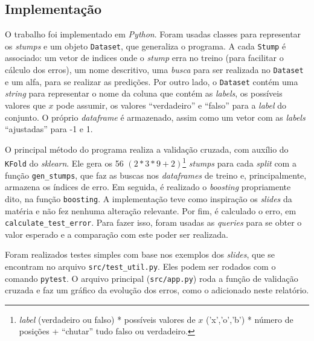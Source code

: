 \documentclass[a4paper]{article}
\begin{document}
\subsection*{Implementação}

O trabalho foi implementado em \textit{Python}. Foram usadas classes para representar os \textit{stumps} e um objeto \texttt{Dataset}, que generaliza o programa. A cada \texttt{Stump} é associado: um vetor de indices onde o \textit{stump} erra no treino (para facilitar o cálculo dos erros), um nome descritivo, uma \textit{busca} para ser realizada no \texttt{Dataset} e um alfa, para se realizar as predições. Por outro lado, o \texttt{Dataset} contém uma \textit{string} para representar o nome da coluna que contém as \textit{labels}, os possíveis valores que $x$ pode assumir, os valores ``verdadeiro'' e ``falso'' para a \textit{label} do conjunto. O próprio \textit{dataframe} é armazenado, assim como um vetor com as \textit{labels} ``ajustadas'' para -1 e 1.

O principal método do programa realiza a validação cruzada, com auxílio do \texttt{KFold} do \textit{sklearn}. Ele gera os 56 $(2*3*9+2)$\footnote{\textit{label} (verdadeiro ou falso) * possíveis valores de $x$ ('x','o','b') * número de posições + ``chutar'' tudo falso ou verdadeiro.} \textit{stumps} para cada \textit{split} com a função \texttt{gen\_stumps}, que faz as buscas nos \textit{dataframes} de treino e, principalmente, armazena os índices de erro. Em seguida, é realizado o \textit{boosting} propriamente dito, na função \texttt{boosting}. A implementação teve como inspiração os \textit{slides} da matéria e não fez nenhuma alteração relevante. Por fim, é calculado o erro, em \texttt{calculate\_test\_error}. Para fazer isso, foram usadas as \textit{queries} para se obter o valor esperado e a comparação com este poder ser realizada.

Foram realizados testes simples com base nos exemplos dos \textit{slides}, que se encontram no arquivo \texttt{src/test\_util.py}. Eles podem ser rodados com o comando \texttt{pytest}. O arquivo principal (\texttt{src/app.py}) roda a função de validação cruzada e faz um gráfico da evolução dos erros, como o adicionado neste relatório.
\end{document}
